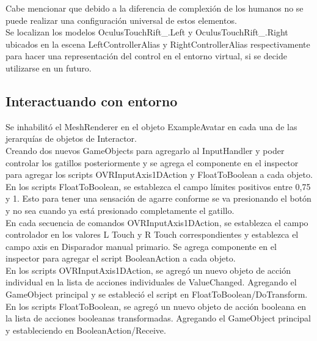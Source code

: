 Cabe mencionar que debido a la diferencia de complexión de los humanos no se puede realizar una configuración universal de estos elementos.\\

Se localizan los modelos OculusTouchRift\_.Left y OculusTouchRift\_.Right ubicados en la  escena LeftControllerAlias y RightControllerAlias respectivamente para hacer una representación del control en el entorno virtual, si se decide utilizarse en un futuro.\\

\subsection{Interactuando con entorno}

Se inhabilitó el MeshRenderer en el objeto ExampleAvatar en cada una de las jerarquías de objetos de Interactor.\\

Creando dos nuevos GameObjects para agregarlo al InputHandler y poder controlar los gatillos posteriormente y se agrega el componente en el inspector para agregar los scripts OVRInputAxis1DAction y FloatToBoolean a cada objeto.\\

En los scripts FloatToBoolean, se establezca el campo límites positivos entre 0,75 y 1. Esto para tener una sensación de agarre conforme se va presionando el botón y no sea cuando ya está presionado completamente el gatillo.\\

En cada secuencia de comandos OVRInputAxis1DAction, se establezca el campo controlador en los valores L Touch y R Touch correspondientes y establezca el campo axis en Disparador manual primario. Se agrega componente en el inspector para agregar el script BooleanAction a cada objeto.\\

En los scripts OVRInputAxis1DAction, se agregó un nuevo objeto de acción individual en la lista de acciones individuales de ValueChanged. Agregando el GameObject principal y se estableció el script en FloatToBoolean/DoTransform.\\

En los scripts FloatToBoolean, se agregó un nuevo objeto de acción booleana en la lista de acciones booleanas transformadas. Agregando el GameObject principal y estableciendo en BooleanAction/Receive.\\

